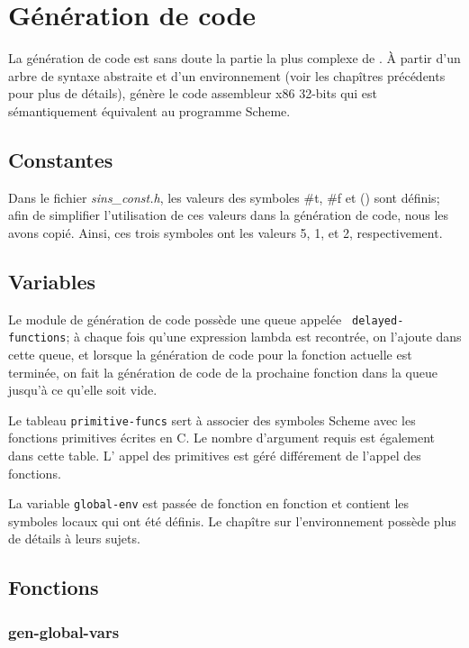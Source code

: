 \documentclass[10pt]{report}
\begin{document}
\chapter{Génération de code}

La génération de code est sans doute la partie la plus complexe de
\sins{}.  À partir d'un arbre de syntaxe abstraite et d'un
environnement (voir les chapîtres précédents pour plus de détails),
\sins{} génère le code assembleur x86 32-bits qui est sémantiquement
équivalent au programme Scheme.

\section{Constantes}

Dans le fichier {\it sins_const.h}, les valeurs des symboles \#t,
\#f et () sont définis; afin de simplifier l'utilisation de ces
valeurs dans la génération de code, nous les avons copié.  Ainsi, ces
trois symboles ont les valeurs 5, 1, et 2, respectivement.

\section{Variables}

Le module de génération de code possède une queue appelée {\tt
  delayed-functions}; à chaque fois qu'une expression lambda est
recontrée, on l'ajoute dans cette queue, et lorsque la génération de
code pour la fonction actuelle est terminée, on fait la génération de
code de la prochaine fonction dans la queue jusqu'à ce qu'elle soit
vide.

Le tableau {\tt primitive-funcs} sert à associer des symboles Scheme
avec les fonctions primitives écrites en C.  Le nombre d'argument
requis est également dans cette table.  L' appel des primitives est
géré différement de l'appel des fonctions.

La variable {\tt global-env} est passée de fonction en fonction et
contient les symboles locaux qui ont été définis.  Le chapître sur
l'environnement possède plus de détails à leurs sujets.



\section{Fonctions}

\subsection{gen-global-vars}
\end{document}
